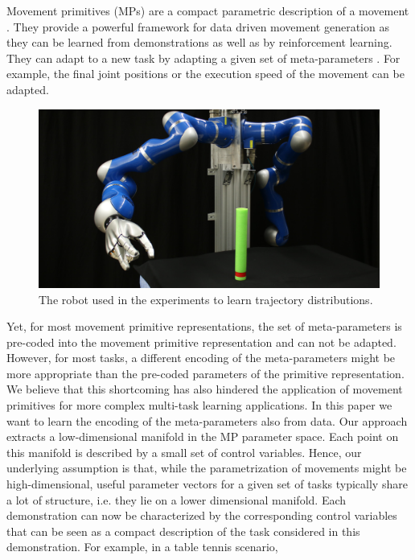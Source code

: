 Movement primitives (MPs) are a compact parametric description of a movement
\cite{Paraschos2013,Ijspeert2003,Khansari-Zadeh2011,dAvella2003}. They provide a powerful framework for 
data driven movement generation as they can be learned from demonstrations as well as by reinforcement learning. They can adapt
to a new task by adapting a given set of meta-parameters
\cite{Ude2010,Kober2010, Kupcsik2013}. For example, the final joint positions or the execution speed \cite{Ijspeert2003} of the movement can be adapted. 
\begin{figure}
\begin{center}
\includegraphics[width=0.38\columnwidth]{elmarICRA/pics/IMG_1062_mod2.JPG}
\end{center}
\caption{The robot used in the experiments to learn trajectory distributions.}
\vspace{-1.5em}
\end{figure}
Yet, for most movement primitive representations, the 
set of meta-parameters is pre-coded into the movement primitive representation and can not be adapted. However, for most tasks, a different encoding of the meta-parameters
might be more appropriate than the pre-coded parameters of the primitive representation. We believe that this shortcoming has 
also hindered the application of movement primitives for more complex multi-task learning applications. In this paper we want to 
learn the encoding of the meta-parameters also from data. Our approach extracts a low-dimensional manifold in the MP parameter space. Each point 
on this manifold is described by a small set of control variables. Hence, our underlying assumption is that, while the parametrization of 
movements might be high-dimensional, useful parameter vectors for a given set of tasks typically share a lot of structure, i.e. they lie on a lower dimensional manifold.
Each demonstration can now be characterized by the corresponding 
control variables that can be seen as a compact description of the task considered in this demonstration. For example, in a table tennis scenario,

